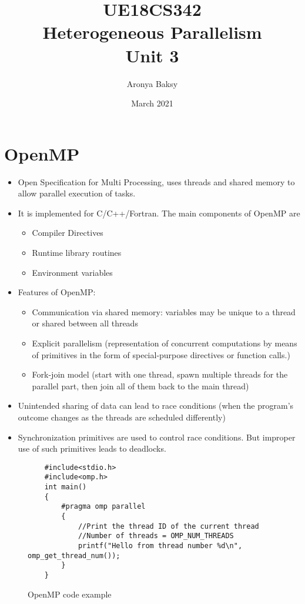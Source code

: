 \documentclass{article}
\title{UE18CS342 \\Heterogeneous Parallelism \\Unit 3}
\author{Aronya Baksy}
\date{March 2021}
\begin{document}
\maketitle

\section{OpenMP}
\begin{itemize}
    \item Open Specification for Multi Processing, uses threads and shared memory to allow parallel execution of tasks. 
    
    \item It is implemented for C/C++/Fortran. The main components of OpenMP are 
    \begin{itemize}
        \item Compiler Directives
        
        \item Runtime library routines 
        
        \item Environment variables
    \end{itemize}
    
    \item Features of OpenMP:
    \begin{itemize}
        \item Communication via shared memory: variables may be unique to a thread or shared between all threads
        
        \item Explicit parallelism (representation of concurrent computations by means of primitives in the form of special-purpose directives or function calls.)
        
        \item Fork-join model (start with one thread, spawn multiple threads for the parallel part, then join all of them back to the main thread)
    \end{itemize}
    
    \item Unintended sharing of data can lead to race conditions (when the program’s outcome changes as the threads are scheduled differently)
    
    \item Synchronization primitives are used to control race conditions. But improper use of such primitives leads to deadlocks.
\end{itemize}
\begin{figure}[!h]
\centering
    \begin{verbatim}
    #include<stdio.h>
    #include<omp.h>
    int main()
    {
        #pragma omp parallel
        {
            //Print the thread ID of the current thread
            //Number of threads = OMP_NUM_THREADS
            printf("Hello from thread number %d\n", omp_get_thread_num());  
        }
    }
    \end{verbatim}
    \caption{OpenMP code example}
\end{figure}
\end{document}
